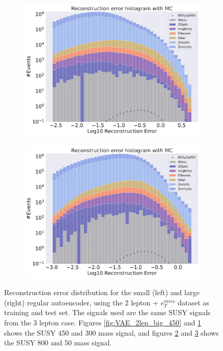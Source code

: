 \begin{figure}[H]
\begin{subfigure}{.45\textwidth}
        \caption{}
        \label{fig:VAE_2lep_small_450}
    \end{subfigure}
    \hfill
    \begin{subfigure}{.45\textwidth}
        \includegraphics[width=\textwidth]{Figures/VAE_testing/big/2lep/b_data_recon_big_rm3_feats_sig_800p0p050_.pdf}
        \caption{}
        \label{fig:VAE_2lep_big_800}
    \end{subfigure}
    \hfill   
    \begin{subfigure}{.45\textwidth}
        \includegraphics[width=\textwidth]{Figures/VAE_testing/small/2lep/b_data_recon_big_rm3_feats_sig_800p0p050_.pdf}
        \caption{}
        \label{fig:VAE_2lep_small_800}
    \end{subfigure}
    \hfill      
    \caption[2lep reconstruction error with SUSY signals for VAE]{Reconstruction error distribution for the small (left) and large (right)
    regular autoencoder, using the 2 lepton + $e_T^{miss}$ dataset as training and test set. The signals used are the same SUSY signals 
    from the 3 lepton case. Figures \ref{fig:VAE_2lep_big_450} and \ref{fig:VAE_2lep_small_450} shows the SUSY 450 and 300 mass signal, 
    and figures \ref{fig:VAE_2lep_big_800} and \ref{fig:VAE_2lep_small_800} shows the SUSY 800 and 50 mass signal.}
    \label{fig:VAE_2lep_recon_err_both_sig}
\end{figure}


